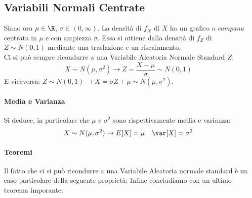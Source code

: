	\subsection{Variabili Normali Centrate}
	Siano ora $\mu \in \R$, $\sigma \in (0, \infty)$.
	La densità di $f_X$ di $X$ ha un grafico a \emph{campana} centrata in $\mu$ e con ampiezza $\sigma$.
	Essa si ottiene dalla densità di $f_Z$ di $Z \sim N(0,1)$
	mediante una traslazione e un riscalamento.
	\\Ci si può sempre ricondurre a una Variabile Aleatoria Normale Standard $Z$:
	\[
		X \sim N(\mu, \sigma^2) \rightarrow Z = \frac{X-\mu}{\sigma} \sim N(0,1)
	\]
	E viceversa: $ Z \sim N(0,1) \rightarrow X = \sigma Z + \mu \sim N(\mu, \sigma^2) $.
	\paragraph{Media e Varianza}
	Si deduce, in particolare che $\mu$ e $\sigma^2$ sono rispettivamente media e varianza:
\[
	X \sim N(\mu, \sigma^2) \rightarrow E[X] = \mu \quad \var[X] = \sigma^2
\]
\paragraph{Teoremi}
Il fatto che ci si può ricondurre a una Variabile Aleatoria normale standard è un caso particolare
della seguente proprietà:
Infine concludiamo con un ultimo teorema imporante:

